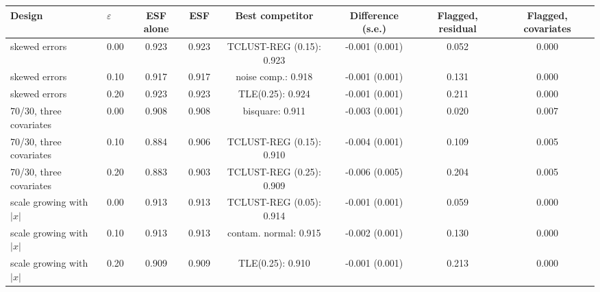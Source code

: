 \begin{tabular}{llcccccc}
\toprule
Design & $\varepsilon$ & ESF alone & ESF & Best competitor & Difference (s.e.) & Flagged, residual & Flagged, covariates \\
\midrule
skewed errors & 0.00 & 0.923 & 0.923 & TCLUST-REG (0.15): 0.923 & -0.001 (0.001) & 0.052 & 0.000 \\
skewed errors & 0.10 & 0.917 & 0.917 & noise comp.: 0.918 & -0.001 (0.001) & 0.131 & 0.000 \\
skewed errors & 0.20 & 0.923 & 0.923 & TLE(0.25): 0.924 & -0.001 (0.001) & 0.211 & 0.000 \\
70/30, three covariates & 0.00 & 0.908 & 0.908 & bisquare: 0.911 & -0.003 (0.001) & 0.020 & 0.007 \\
70/30, three covariates & 0.10 & 0.884 & 0.906 & TCLUST-REG (0.15): 0.910 & -0.004 (0.001) & 0.109 & 0.005 \\
70/30, three covariates & 0.20 & 0.883 & 0.903 & TCLUST-REG (0.25): 0.909 & -0.006 (0.005) & 0.204 & 0.005 \\
scale growing with $|x|$ & 0.00 & 0.913 & 0.913 & TCLUST-REG (0.05): 0.914 & -0.001 (0.001) & 0.059 & 0.000 \\
scale growing with $|x|$ & 0.10 & 0.913 & 0.913 & contam. normal: 0.915 & -0.002 (0.001) & 0.130 & 0.000 \\
scale growing with $|x|$ & 0.20 & 0.909 & 0.909 & TLE(0.25): 0.910 & -0.001 (0.001) & 0.213 & 0.000 \\
\bottomrule
\end{tabular}